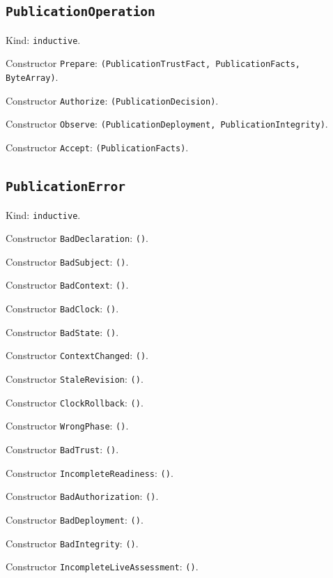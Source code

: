 \documentclass[11pt]{article}
\begin{document}
\subsection*{\texttt{PublicationOperation}}
\noindent Kind: \texttt{inductive}.\par
\noindent Constructor \texttt{Prepare}: \texttt{(PublicationTrustFact, PublicationFacts, ByteArray)}.\par
\noindent Constructor \texttt{Authorize}: \texttt{(PublicationDecision)}.\par
\noindent Constructor \texttt{Observe}: \texttt{(PublicationDeployment, PublicationIntegrity)}.\par
\noindent Constructor \texttt{Accept}: \texttt{(PublicationFacts)}.\par
\subsection*{\texttt{PublicationError}}
\noindent Kind: \texttt{inductive}.\par
\noindent Constructor \texttt{BadDeclaration}: \texttt{()}.\par
\noindent Constructor \texttt{BadSubject}: \texttt{()}.\par
\noindent Constructor \texttt{BadContext}: \texttt{()}.\par
\noindent Constructor \texttt{BadClock}: \texttt{()}.\par
\noindent Constructor \texttt{BadState}: \texttt{()}.\par
\noindent Constructor \texttt{ContextChanged}: \texttt{()}.\par
\noindent Constructor \texttt{StaleRevision}: \texttt{()}.\par
\noindent Constructor \texttt{ClockRollback}: \texttt{()}.\par
\noindent Constructor \texttt{WrongPhase}: \texttt{()}.\par
\noindent Constructor \texttt{BadTrust}: \texttt{()}.\par
\noindent Constructor \texttt{IncompleteReadiness}: \texttt{()}.\par
\noindent Constructor \texttt{BadAuthorization}: \texttt{()}.\par
\noindent Constructor \texttt{BadDeployment}: \texttt{()}.\par
\noindent Constructor \texttt{BadIntegrity}: \texttt{()}.\par
\noindent Constructor \texttt{IncompleteLiveAssessment}: \texttt{()}.\par
\end{document}
